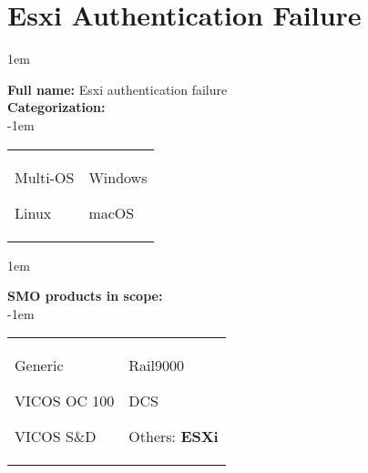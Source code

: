 
%
%

\section{Esxi Authentication Failure}
\label{15401}

\openup 1em

\textbf{Full name:} Esxi authentication failure\hrulefill \\
{\bf Categorization:} \\

\openup -1em
\vspace{-3em}

\begin{tabular}{p{}p{}}

\begin{todolist}
  	\item Multi-OS
	\item[\done] Linux
\end{todolist}
&
\begin{todolist}
	\item Windows
	\item macOS
\end{todolist}

\end{tabular}

\openup 1em

{\bf SMO products in scope:} \\

\openup -1em
\vspace{-3em}

\begin{tabular}{p{}p{}}

\begin{todolist}
  \item Generic
  \item VICOS OC 100
  \item VICOS S\&D
\end{todolist}
&
\begin{todolist}
  \item Rail9000
  \item DCS
  \item Others: \bf{ESXi} \hrulefill
\end{todolist}

\end{tabular}


